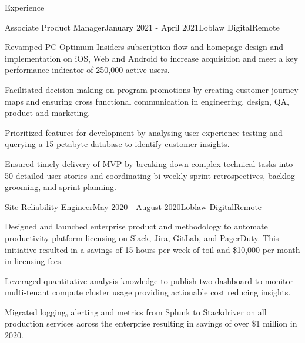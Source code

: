 \documentclass{resume} %
\begin{document}

\begin{rSection}{Experience}

\begin{rSubsection}{Associate Product Manager}{January 2021 - April 2021}{Loblaw Digital}{Remote}
\item Revamped PC Optimum Insiders subscription flow and homepage design and implementation on iOS, Web and Android to increase acquisition and meet a key performance indicator of 250,000 active users. 
\item Facilitated decision making on program promotions by creating customer journey maps and ensuring cross functional communication in engineering, design, QA, product and marketing. 
\item Prioritized features for development by analysing user experience testing and querying a 15 petabyte database to identify customer insights.
\item  Ensured timely delivery of MVP by breaking down complex technical tasks into 50 detailed user stories and coordinating bi-weekly sprint retrospectives, backlog grooming, and sprint planning.
\end{rSubsection}


\begin{rSubsection}{Site Reliability Engineer}{May 2020 - August 2020}{Loblaw Digital}{Remote}
\item Designed and launched enterprise product and methodology to automate productivity platform licensing on Slack, Jira, GitLab, and PagerDuty. This initiative resulted in a savings of 15 hours per week of toil and \$10,000 per month in licensing fees. 
\item Leveraged quantitative analysis knowledge to publish two dashboard to monitor multi-tenant compute cluster usage providing actionable cost reducing insights.
\item Migrated logging, alerting and metrics from Splunk to Stackdriver on all production services across the enterprise resulting in savings of over \$1 million in 2020.
\end{rSubsection}



\end{rSection}
\end{document}
